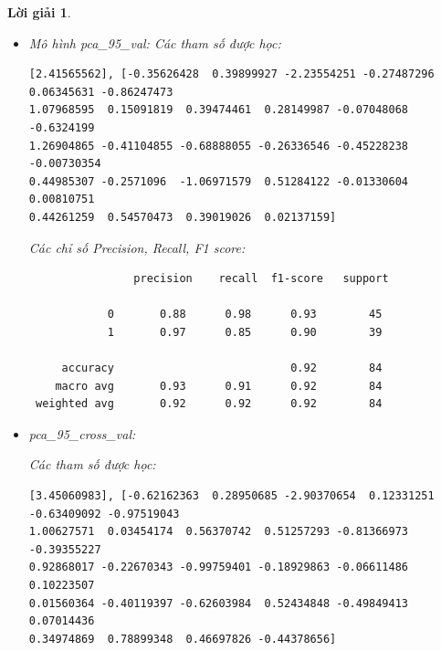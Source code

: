 \documentclass[14pt, a4paper]{article}
\theoremstyle{sltheorem}
\theoremstyle{soltheorem}
\newtheorem*{loigiai}{Lời giải}
\begin{document}
\begin{loigiai}
\begin{itemize}
        Các chỉ số Precision, Recall, F1 score:

        \begin{verbatim}
                precision    recall  f1-score   support

            0       0.76      0.78      0.77        45
            1       0.74      0.72      0.73        39
 
     accuracy                           0.75        84
    macro avg       0.75      0.75      0.75        84
 weighted avg       0.75      0.75      0.75        84
        \end{verbatim}

        \item Mô hình pca\_95\_val:
        Các tham số được học:

        \begin{verbatim}
[2.41565562], [-0.35626428  0.39899927 -2.23554251 -0.27487296  0.06345631 -0.86247473
1.07968595  0.15091819  0.39474461  0.28149987 -0.07048068 -0.6324199
1.26904865 -0.41104855 -0.68888055 -0.26336546 -0.45228238 -0.00730354
0.44985307 -0.2571096  -1.06971579  0.51284122 -0.01330604  0.00810751
0.44261259  0.54570473  0.39019026  0.02137159]
        \end{verbatim}

        Các chỉ số Precision, Recall, F1 score:
        \begin{verbatim}
                precision    recall  f1-score   support

            0       0.88      0.98      0.93        45
            1       0.97      0.85      0.90        39
 
     accuracy                           0.92        84
    macro avg       0.93      0.91      0.92        84
 weighted avg       0.92      0.92      0.92        84
        \end{verbatim}

        \item pca\_95\_cross\_val:
        
        Các tham số được học:

        \begin{verbatim}
[3.45060983], [-0.62162363  0.28950685 -2.90370654  0.12331251 -0.63409092 -0.97519043
1.00627571  0.03454174  0.56370742  0.51257293 -0.81366973 -0.39355227
0.92868017 -0.22670343 -0.99759401 -0.18929863 -0.06611486  0.10223507
0.01560364 -0.40119397 -0.62603984  0.52434848 -0.49849413  0.07014436
0.34974869  0.78899348  0.46697826 -0.44378656]
        \end{verbatim}


\end{itemize}
\end{loigiai}
\end{document}
